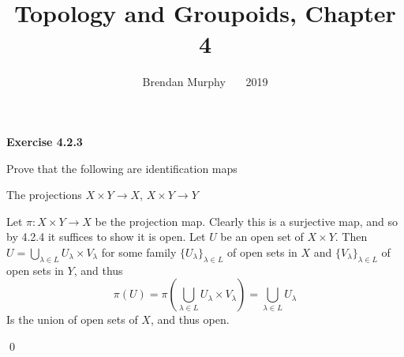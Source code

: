 \documentclass[12pt]{article}
\newcommand{\qcolor}{Gray}
\newcommand{\acolor}{Black}
\newcommand{\question}[1]{
	\color{\qcolor} 
	\item[#1~]}
\newcommand{\answer}[0]{
	\color{\acolor} 
	\item[]}
\newenvironment{exercise}[1]
{
	{
		\Large
		\color{\acolor}
		\addtolength\leftskip{-2em}
		\textbf{Exercise #1}
		
	}
	\begin{list}{}
	{
		\setlength\leftmargin{1em}
		\setlength\rightmargin{0em}
		\setlength\labelwidth{2em}
		\setlength\itemsep{0em}
		\setlength\parsep{0.5em}
		\setlength\baselineskip{1.25em}
	}
}
{
  \qed{}
  \end{list}
}
\begin{document}
\title{\Huge Topology and Groupoids, Chapter 4}
\author{Brendan Murphy \ \textemdash\ \ 2019}
\date{\vspace{-7ex}}

\posttitle{\par\end{center}}\maketitle

\begin{exercise}{4.2.3}
  \question{} Prove that the following are identification maps
  \question{(i)} The projections $X \times Y \to X$, $X \times Y \to Y$
  \answer
  Let $\pi : X \times Y \to X$ be the projection map. Clearly this is a surjective map, and so by 4.2.4 it suffices to show it is open. Let $U$ be an open set of $X \times Y$. Then $U = \bigcup_{\lambda \in L} U_{\lambda} \times V_{\lambda}$ for some family $\{U_{\lambda}\}_{\lambda \in L}$ of open sets in $X$ and $\{V_{\lambda}\}_{\lambda \in L}$ of open sets in $Y$, and thus $$\pi(U) = \pi\left(\bigcup_{\lambda \in L} U_{\lambda} \times V_{\lambda}\right) = \bigcup_{\lambda \in L} U_{\lambda}$$
  Is the union of open sets of $X$, and thus open.
\end{exercise}
\end{document}
